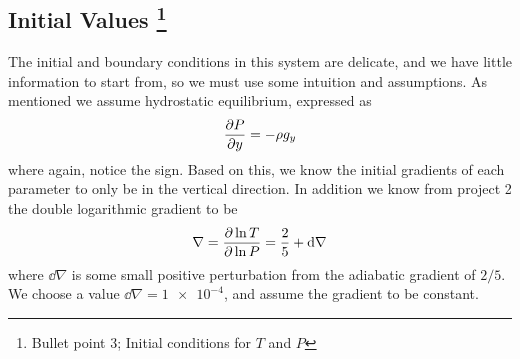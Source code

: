 \documentclass[11pt,a4paper,twocolumn,titlepage]{article}
\begin{document}
\subsection[Initial Values]{Initial Values \protect\footnote{Bullet point 3; Initial conditions for $T$ and $P$}}\label{subsec:Governing/Initial values}
The initial and boundary conditions in this system are delicate, and we have little information to start from, so we must use some intuition and assumptions. As mentioned we assume hydrostatic equilibrium, expressed as
\begin{equation}
\pdv{P}{y} = - \rho g_y
\label{eq:Hydro equi}
\end{equation}
where again, notice the sign. Based on this, we know the initial gradients of each parameter to only be in the vertical direction. In addition we know from project 2 the double logarithmic gradient to be
\begin{equation}
\nabla = \pdv{\ln T}{\ln P} = \frac{2}{5} + \dd{\nabla}
\end{equation}
where $\dd{\nabla}$ is some small positive perturbation from the adiabatic gradient of $2/5$. We choose a value $\dd{\nabla}= \num{1e-4}$, and assume the gradient to be constant.
\end{document}
